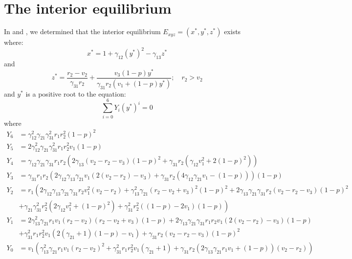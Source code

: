 \section{The interior equilibrium}\label{sec:numsim_interior_equilibrium}
In  and , we determined that the interior equilibrium $E_{xyz}=\left(x^*,y^*,z^*\right)$ exists where:
\[
x^*=1+\gamma_{12}\left(y^*\right)^2-\gamma_{13}z^*
\]
and
\[
z^*=\frac{r_2-v_2}{\gamma_{31}r_2}+\frac{v_3\left(1-p\right)y^*}{\gamma_{31}r_2\left(v_1+\left(1-p\right)y^*\right)};\quad r_2>v_2
\]
and $y^*$ is a positive root to the equation:
\begin{equation*}
    \sum_{i=0}^6 Y_i\left(y^*\right)^i=0
\end{equation*}
where
\begin{align*}
    Y_6 &= \gamma_{12}^2\gamma_{21}\gamma_{31}^2r_1r_2^2\left(1-p\right)^2\\
    Y_5 &= 2\gamma_{12}^2\gamma_{21}\gamma_{31}^2r_1r_2^2v_1\left(1-p\right)\\
    Y_4 &= \gamma_{12}\gamma_{21}\gamma_{31}r_1r_2\left(2\gamma_{13}\left(v_2-r_2-v_3\right)\left(1-p\right)^2+\gamma_{31}r_2\left(\gamma_{12}v_1^2+2\left(1-p\right)^2\right)\right)\\
    Y_3 &= \gamma_{31}r_1r_2\left(2\gamma_{12}\gamma_{13}\gamma_{21}v_1\left(2\left(v_2-r_2\right)-v_3\right)+\gamma_{31}r_2\left(4\gamma_{12}\gamma_{21}v_1-\left(1-p\right)\right)\right)\left(1-p\right)\\
    Y_2 &= r_1\left(2\gamma_{12}\gamma_{13}\gamma_{21}\gamma_{31}r_2v_1^2\left(v_2-r_2\right)+\gamma_{13}^2\gamma_{21}\left(r_2-v_2+v_3\right)^2\left(1-p\right)^2+2\gamma_{13}\gamma_{21}\gamma_{31}r_2\left(v_2-r_2-v_3\right)\left(1-p\right)^2\right.\\
    &\left.+\gamma_{21}\gamma_{31}^2r_2^2\left(2\gamma_{12}v_1^2+\left(1-p\right)^2\right)+\gamma_{31}^2r_2^2\left(\left(1-p\right)-2v_1\right)\left(1-p\right)\right)\\
    Y_1 &= 2\gamma_{13}^2\gamma_{21}r_1v_1\left(r_2-v_2\right)\left(r_2-v_2+v_3\right)\left(1-p\right)+2\gamma_{13}\gamma_{21}\gamma_{31}r_1r_2v_1\left(2\left(v_2-r_2\right)-v_3\right)\left(1-p\right)\\
    &+\gamma_{31}^2r_1r_2^2v_1\left(2\left(\gamma_{21}+1\right)\left(1-p\right)-v_1\right)+\gamma_{31}r_2\left(v_2-r_2-v_3\right)\left(1-p\right)^2\\
    Y_0 &= v_1\left(\gamma_{13}^2\gamma_{21}r_1v_1\left(r_2-v_2\right)^2+\gamma_{31}^2r_1r_2^2v_1\left(\gamma_{21}+1\right)+\gamma_{31}r_2\left(2\gamma_{13}\gamma_{21}r_1v_1+\left(1-p\right)\right)\left(v_2-r_2\right)\right)
\end{align*}
